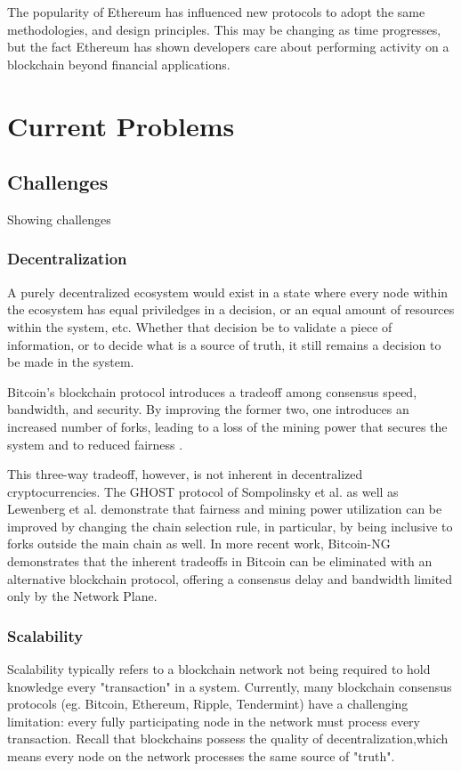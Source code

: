 \documentclass[12pt, titlepage, twocolumn]{report}
\begin{document}
The popularity of Ethereum has influenced new protocols to adopt the same methodologies, and design principles. This may be changing as time progresses, but the fact Ethereum has shown developers care about performing activity on a blockchain beyond financial applications. 


\chapter{Current Problems}

\section{Challenges}
Showing challenges

\subsection{Decentralization}
A purely decentralized ecosystem would exist in a state where every node within the ecosystem has equal priviledges in a decision, or an equal amount of resources within the system, etc. Whether that decision be to validate a piece of information, or to decide what is a source of truth, it still remains a decision to be made in the system.

Bitcoin's blockchain protocol introduces a tradeoff among consensus speed, bandwidth, and security. By improving the former two, one introduces an increased number of forks, leading to a loss of the mining power that secures the system and to reduced fairness \cite{scalable_blockchain_tech_report}.

This three-way tradeoff, however, is not inherent in decentralized cryptocurrencies. The GHOST protocol \cite{secure_high_rate_transaction} of Sompolinsky et al. as well as Lewenberg et al. \cite{inclusive_block} demonstrate that fairness and mining power utilization can be improved by changing the chain selection rule, in particular, by being inclusive to forks outside the main chain as well. In more recent work, Bitcoin-NG \cite{secure_high_rate_transaction} demonstrates that the inherent tradeoffs in Bitcoin can be eliminated with an alternative blockchain protocol, offering a consensus delay and bandwidth limited only by the Network Plane.


\subsection{Scalability}
Scalability typically refers to a blockchain network not being required to hold knowledge every "transaction" in a system. Currently, many blockchain consensus protocols (eg. Bitcoin, Ethereum, Ripple, Tendermint) have a challenging limitation: every fully participating node in the network must process every transaction. Recall that blockchains possess the quality of decentralization,which means every node on the network processes the same source of "truth".
 
\end{document}
